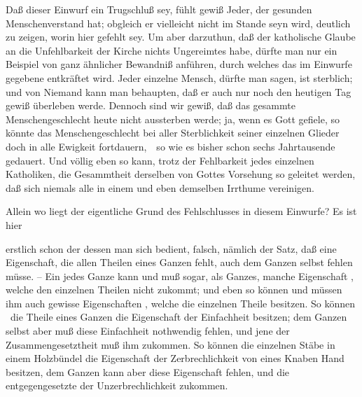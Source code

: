 \begin{aufza}
\item Daß dieser Einwurf ein Trugschluß sey, fühlt gewiß Jeder, der gesunden Menschenverstand hat; obgleich er vielleicht nicht im Stande seyn wird, deutlich zu zeigen, worin hier gefehlt sey. Um aber darzuthun, daß der katholische Glaube an die Unfehlbarkeit der Kirche nichts Ungereimtes habe, dürfte man nur ein Beispiel von ganz ähnlicher Bewandniß anführen, durch welches das im Einwurfe gegebene entkräftet wird. Jeder einzelne Mensch, dürfte man sagen, ist sterblich; und von Niemand kann man behaupten, daß er auch nur noch den heutigen Tag gewiß überleben werde. Dennoch sind wir gewiß, daß das gesammte Menschengeschlecht heute nicht aussterben werde; ja, wenn es Gott gefiele, so könnte das Menschengeschlecht bei aller Sterblichkeit seiner einzelnen Glieder doch in alle Ewigkeit fortdauern,~\ so wie es bisher schon sechs Jahrtausende gedauert. Und völlig eben so kann, trotz der Fehlbarkeit jedes einzelnen Katholiken, die Gesammtheit derselben von Gottes Vorsehung so geleitet werden, daß sich niemals alle in einem und eben demselben Irrthume vereinigen.
\item Allein wo liegt der eigentliche Grund des Fehlschlusses in diesem Einwurfe? Es ist hier
\begin{aufzb}
\item erstlich schon der  dessen man sich bedient, falsch, nämlich der Satz, daß eine Eigenschaft, die allen Theilen eines Ganzen fehlt, auch dem Ganzen selbst fehlen müsse. -- Ein jedes Ganze kann und muß sogar, als Ganzes, manche Eigenschaft , welche den einzelnen Theilen nicht zukommt; und eben so können und müssen ihm auch gewisse Eigenschaften , welche die einzelnen Theile besitzen. So können \zB\ die Theile eines Ganzen die Eigenschaft der Einfachheit besitzen; dem Ganzen selbst aber muß diese Einfachheit nothwendig fehlen, und jene der Zusammengesetztheit muß ihm zukommen. So können die einzelnen Stäbe in einem Holzbündel die Eigenschaft der Zerbrechlichkeit von eines Knaben Hand besitzen, dem Ganzen kann aber diese Eigenschaft fehlen, und die entgegengesetzte der Unzerbrechlichkeit zukommen.

\end{aufzb}
\end{aufza}
